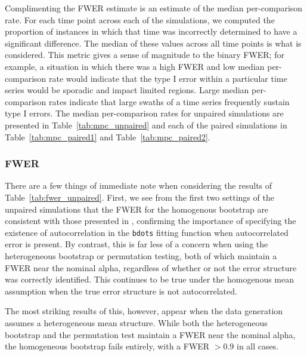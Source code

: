 \documentclass{article}
\newcommand{\xt}{\texttt}
\begin{document}
Complimenting the FWER estimate is an estimate of the median per-comparison rate. For each time point across each of the simulations, we computed the proportion of instances in which that time was incorrectly determined to have a significant difference. The median of these values across all time points is what is considered. This metric gives a sense of magnitude to the binary FWER; for example, a situation in which there was a high FWER and low median per-comparison rate would indicate that the type I error within a particular time series would be sporadic and impact limited regions. Large median per-comparison rates indicate that large swaths of a time series frequently sustain type I errors. The median per-comparison rates for unpaired simulations are presented in Table~\ref{tab:mpc_unpaired} and each of the paired simulations in Table~\ref{tab:mpc_paired1} and Table~\ref{tab:mpc_paired2}.


\subsubsection{FWER}



There are a few things of immediate note when considering the results of Table~\ref{tab:fwer_unpaired}. First, we see from the first two settings of the unpaired simulations that the FWER for the homogenous bootstrap are consistent with those presented in \citet{oleson2017detecting}, confirming the importance of specifying the existence of autocorrelation in the \xt{bdots} fitting function when autocorrelated error is present. By contrast, this is far less of a concern when using the heterogeneous bootstrap or permutation testing, both of which maintain a FWER near the nominal alpha, regardless of whether or not the error structure was correctly identified. This continues to be true under the homogenous mean assumption when the true error structure is not autocorrelated. 

The most striking results of this, however, appear when the data generation assumes a heterogeneous mean structure. While both the heterogeneous bootstrap and the permutation test maintain a FWER near the nominal alpha, the homogeneous bootstrap fails entirely, with a FWER $> 0.9$ in all cases.
\end{document}
